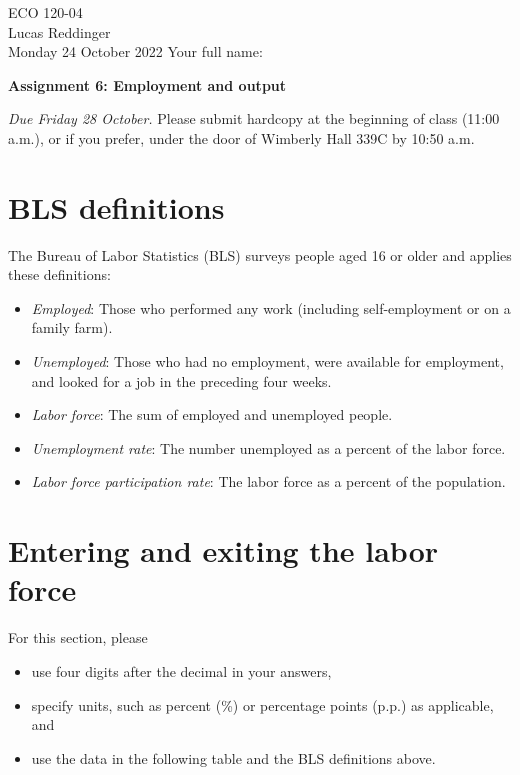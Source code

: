\documentclass[
    letterpaper,paper=portrait,fleqn,
    DIV=16,fontsize=12pt,twoside=semi,
    parskip=full-,
    headings=standardclasses]
{scrartcl}
\begin{document}
\RaggedRight
\thispagestyle{plain}

ECO 120-04 \\
Lucas Reddinger \\
Monday 24 October 2022 \hfill Your full name: \underline{\hspace{3.25in}}

\vspace{0.7\baselineskip}
\textbf{\LARGE Assignment 6: Employment and output}
\vspace{0.3\baselineskip}

\emph{Due Friday 28 October.} Please submit hardcopy at the beginning of class (11:00 a.m.), or if you prefer, under the door of Wimberly Hall 339C by 10:50 a.m.

\section{BLS definitions\label{sec:bls-definitions}}

The Bureau of Labor Statistics (BLS) surveys people aged 16 or older and applies these definitions:
\begin{itemize}
\item \emph{Employed}: Those who performed any work (including self-employment or on a family farm).
\item \emph{Unemployed}: Those who had no employment, were available for employment, and looked for a job in the preceding four weeks.
\item \emph{Labor force}: The sum of employed and unemployed people.
\item \emph{Unemployment rate}: The number unemployed as a percent of the labor force.
\item \emph{Labor force participation rate}: The labor force as a percent of the population.
\end{itemize}

\section{Entering and exiting the labor force}

For this section, please
\begin{itemize}[nosep]
\item use four digits after the decimal in your answers,
\item specify units, such as percent (\%) or percentage points (p.p.) as applicable, and
\item use the data in the following table and the BLS definitions above.
\end{itemize}
\end{document}
